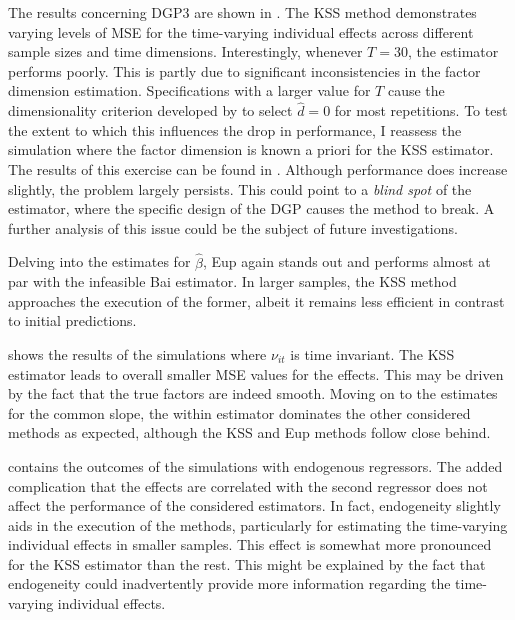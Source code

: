 The results concerning \ac{DGP}3 are shown in . The \ac{KSS} method demonstrates varying levels of \ac{MSE} for the time-varying individual effects across different sample sizes and time dimensions. Interestingly, whenever $T = 30$, the estimator performs poorly. This is partly due to significant inconsistencies in the factor dimension estimation. Specifications with a larger value for $T$ cause the dimensionality criterion developed by \citet{kneip2012new} to select $\hat{d} = 0$ for most repetitions. To test the extent to which this influences the drop in performance, I reassess the simulation where the factor dimension is known a priori for the \ac{KSS} estimator. The results of this exercise can be found in . Although performance does increase slightly, the problem largely persists. This could point to a \textit{blind spot} of the estimator, where the specific design of the \ac{DGP} causes the method to break. A further analysis of this issue could be the subject of future investigations. 

Delving into the estimates for $\hat{\beta}$, \ac{Eup} again stands out and performs almost at par with the infeasible Bai estimator. In larger samples, the \ac{KSS} method approaches the execution of the former, albeit it remains less efficient in contrast to initial predictions. 




 shows the results of the simulations where $\nu_{it}$ is time invariant. The \ac{KSS} estimator leads to overall smaller \ac{MSE} values for the effects. This may be driven by the fact that the true factors are indeed smooth. Moving on to the estimates for the common slope, the within estimator dominates the other considered methods as expected, although the \ac{KSS} and \ac{Eup} methods follow close behind. 



 contains the outcomes of the simulations with endogenous regressors. The added complication that the effects are correlated with the second regressor does not affect the performance of the considered estimators. In fact, endogeneity slightly aids in the execution of the methods, particularly for estimating the time-varying individual effects in smaller samples. This effect is somewhat more pronounced for the \ac{KSS} estimator than the rest. This might be explained by the fact that endogeneity could inadvertently provide more information regarding the time-varying individual effects.


